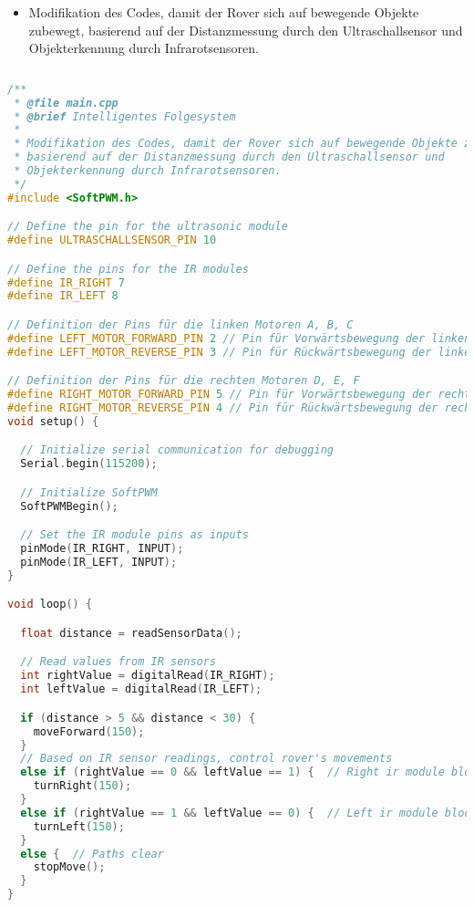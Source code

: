 \documentclass{vorlage-design-main}
\begin{document}
\begin{itemize}

\item
  Modifikation des Codes, damit der Rover sich auf bewegende Objekte
  zubewegt, basierend auf der Distanzmessung durch den Ultraschallsensor
  und Objekterkennung durch Infrarotsensoren.
\end{itemize}

\newpage

\begin{lstlisting}
\end{lstlisting}

\newpage

\begin{lstlisting}[language={C++}]
/**
 * @file main.cpp
 * @brief Intelligentes Folgesystem
 * 
 * Modifikation des Codes, damit der Rover sich auf bewegende Objekte zubewegt,
 * basierend auf der Distanzmessung durch den Ultraschallsensor und 
 * Objekterkennung durch Infrarotsensoren.
 */
#include <SoftPWM.h>

// Define the pin for the ultrasonic module
#define ULTRASCHALLSENSOR_PIN 10

// Define the pins for the IR modules
#define IR_RIGHT 7
#define IR_LEFT 8

// Definition der Pins für die linken Motoren A, B, C
#define LEFT_MOTOR_FORWARD_PIN 2 // Pin für Vorwärtsbewegung der linken Motoren (A, B, C)
#define LEFT_MOTOR_REVERSE_PIN 3 // Pin für Rückwärtsbewegung der linken Motoren (A, B, C)

// Definition der Pins für die rechten Motoren D, E, F
#define RIGHT_MOTOR_FORWARD_PIN 5 // Pin für Vorwärtsbewegung der rechten Motoren (D, E, F)
#define RIGHT_MOTOR_REVERSE_PIN 4 // Pin für Rückwärtsbewegung der rechten Motoren (D, E, F)
void setup() {

  // Initialize serial communication for debugging
  Serial.begin(115200);

  // Initialize SoftPWM
  SoftPWMBegin();

  // Set the IR module pins as inputs
  pinMode(IR_RIGHT, INPUT);
  pinMode(IR_LEFT, INPUT);
}

void loop() {

  float distance = readSensorData();

  // Read values from IR sensors
  int rightValue = digitalRead(IR_RIGHT);
  int leftValue = digitalRead(IR_LEFT);

  if (distance > 5 && distance < 30) {
    moveForward(150);
  }
  // Based on IR sensor readings, control rover's movements
  else if (rightValue == 0 && leftValue == 1) {  // Right ir module blocked
    turnRight(150);
  } 
  else if (rightValue == 1 && leftValue == 0) {  // Left ir module blocked
    turnLeft(150);
  } 
  else {  // Paths clear
    stopMove();
  }
}



\end{lstlisting}
\end{document}
